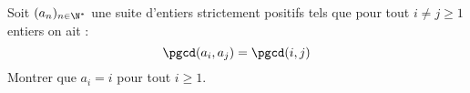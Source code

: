 Soit $(a_n)_{n\in \N^*}$ une suite d'entiers strictement positifs tels que pour tout $i \ne j\ge 1$ entiers on ait :
$$\pgcd(a_i, a_j) = \pgcd(i, j)$$
Montrer que $a_i = i$ pour tout $i\ge 1$.
